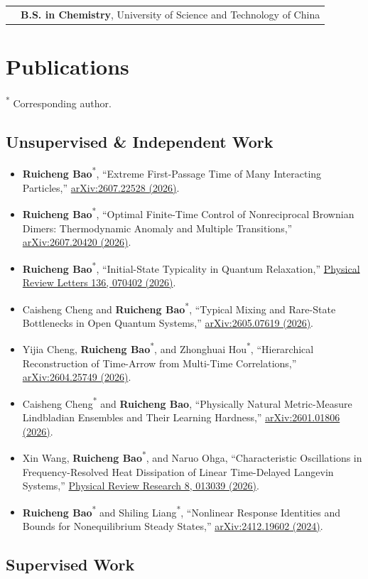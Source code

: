 \documentclass[10pt,a4paper]{article}
\makeatletter
\newcommand{\entry}[2]{%
  \begin{tabularx}{\textwidth}{@{}p{0.19\textwidth}X@{}}
    \color{muted}#1 & #2
  \end{tabularx}\par
}
\newcommand{\pub}[4]{%
  \item #1, ``#2,'' \href{#4}{#3}.
}
\newcommand{\corr}[1]{#1\textsuperscript{*}}
\makeatother
\begin{document}
\entry{}{\textbf{B.S. in Chemistry}, University of Science and Technology of China}

\section{Publications}

{\footnotesize\color{muted}\textsuperscript{*} Corresponding author.}

\subsection{Unsupervised \& Independent Work}

\begin{itemize}
  \pub{\corr{\textbf{Ruicheng Bao}}}{Extreme First-Passage Time of Many Interacting Particles}{arXiv:2607.22528 (2026)}{https://arxiv.org/abs/2607.22528}
  \pub{\corr{\textbf{Ruicheng Bao}}}{Optimal Finite-Time Control of Nonreciprocal Brownian Dimers: Thermodynamic Anomaly and Multiple Transitions}{arXiv:2607.20420 (2026)}{https://arxiv.org/abs/2607.20420}
  \pub{\corr{\textbf{Ruicheng Bao}}}{Initial-State Typicality in Quantum Relaxation}{Physical Review Letters 136, 070402 (2026)}{https://doi.org/10.1103/wgr5-lb6b}
  \pub{Caisheng Cheng and \corr{\textbf{Ruicheng Bao}}}{Typical Mixing and Rare-State Bottlenecks in Open Quantum Systems}{arXiv:2605.07619 (2026)}{https://arxiv.org/abs/2605.07619}
  \pub{Yijia Cheng, \corr{\textbf{Ruicheng Bao}}, and \corr{Zhonghuai Hou}}{Hierarchical Reconstruction of Time-Arrow from Multi-Time Correlations}{arXiv:2604.25749 (2026)}{https://arxiv.org/abs/2604.25749}
  \pub{\corr{Caisheng Cheng} and \textbf{Ruicheng Bao}}{Physically Natural Metric-Measure Lindbladian Ensembles and Their Learning Hardness}{arXiv:2601.01806 (2026)}{https://arxiv.org/abs/2601.01806}
  \pub{Xin Wang, \corr{\textbf{Ruicheng Bao}}, and Naruo Ohga}{Characteristic Oscillations in Frequency-Resolved Heat Dissipation of Linear Time-Delayed Langevin Systems}{Physical Review Research 8, 013039 (2026)}{https://doi.org/10.1103/x2dm-9p8m}
  \pub{\corr{\textbf{Ruicheng Bao}} and \corr{Shiling Liang}}{Nonlinear Response Identities and Bounds for Nonequilibrium Steady States}{arXiv:2412.19602 (2024)}{https://arxiv.org/abs/2412.19602}
\end{itemize}

\newpage
\subsection{Supervised Work}
\end{document}
